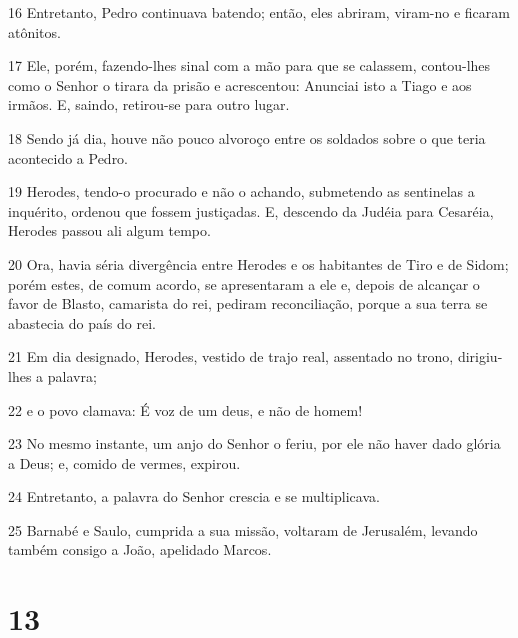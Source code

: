 \par 16 Entretanto, Pedro continuava batendo; então, eles abriram, viram-no e ficaram atônitos.
\par 17 Ele, porém, fazendo-lhes sinal com a mão para que se calassem, contou-lhes como o Senhor o tirara da prisão e acrescentou: Anunciai isto a Tiago e aos irmãos. E, saindo, retirou-se para outro lugar.
\par 18 Sendo já dia, houve não pouco alvoroço entre os soldados sobre o que teria acontecido a Pedro.
\par 19 Herodes, tendo-o procurado e não o achando, submetendo as sentinelas a inquérito, ordenou que fossem justiçadas. E, descendo da Judéia para Cesaréia, Herodes passou ali algum tempo.
\par 20 Ora, havia séria divergência entre Herodes e os habitantes de Tiro e de Sidom; porém estes, de comum acordo, se apresentaram a ele e, depois de alcançar o favor de Blasto, camarista do rei, pediram reconciliação, porque a sua terra se abastecia do país do rei.
\par 21 Em dia designado, Herodes, vestido de trajo real, assentado no trono, dirigiu-lhes a palavra;
\par 22 e o povo clamava: É voz de um deus, e não de homem!
\par 23 No mesmo instante, um anjo do Senhor o feriu, por ele não haver dado glória a Deus; e, comido de vermes, expirou.
\par 24 Entretanto, a palavra do Senhor crescia e se multiplicava.
\par 25 Barnabé e Saulo, cumprida a sua missão, voltaram de Jerusalém, levando também consigo a João, apelidado Marcos.

\chapter{13}

